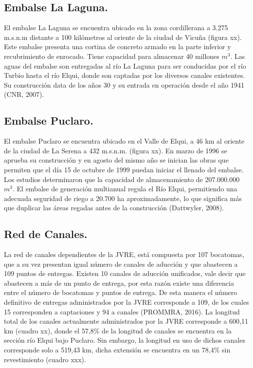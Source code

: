 \documentclass[10pt,]{article}
\begin{document}
\subsection{Embalse La Laguna.} %
El embalse La Laguna se encuentra ubicado en la zona cordillerana a 3.275 m.s.n.m distante a 100 kilómetros al oriente de la ciudad de Vicuña (figura xx). Este embalse presenta una cortina de concreto armado en la parte inferior y recubrimiento de enrocado. Tiene capacidad para almacenar 40 millones $m^3$. Las aguas del embalse son entregadas al río La Laguna para ser conducidas por el río Turbio hasta el río Elqui, donde son captadas por los diversos canales existentes. Su construcción data de los años 30 y su entrada en operación desde el año 1941  (CNR, 2007).

\subsection{Embalse Puclaro.}%
El embalse Puclaro se encuentra ubicado en el Valle de Elqui, a 46 km al oriente de la ciudad de La Serena a 432 m.s.n.m. (figura xx).
En marzo de 1996 se aprueba su construcción y en agosto del mismo año se inician las obras que permiten que el día 15 de octubre de 1999 puedan iniciar el llenado del embalse. Los estudios determinaron que la capacidad de almacenamiento de 207.000.000 $m^3$.
El embalse de generación multianual regula el Río Elqui, permitiendo una adecuada seguridad de riego a 20.700 ha aproximadamente, lo que significa más que duplicar las áreas regadas antes de la construcción (Dattwyler, 2008).

\subsection{Red de Canales.}
La red de canales dependientes de la JVRE, está compuesta por 107 bocatomas, que a su vez presentan igual número de canales de aducción y que abastecen a 109 puntos de entregas. Existen 10 canales de aducción unificados, vale decir que abastecen a más de un punto de entrega, por esta razón existe una diferencia entre el número de bocatomas y puntos de entrega. De esta manera el número definitivo de entregas administrados por la JVRE corresponde a 109, de los cuales 15 corresponden a captaciones y 94 a canales (PROMMRA, 2016).
La longitud total de los canales actualmente administrados por la JVRE corresponde a 600,11 km (cuadro xx), donde el 57,8\% de la longitud de canales se encuentra en la sección río Elqui bajo Puclaro. Sin embargo, la longitud en uso de dichos canales corresponde solo a  519,43 km, dicha extensión se encuentra en un 78,4\% sin revestimiento (cuadro xxx).\\
\end{document}
